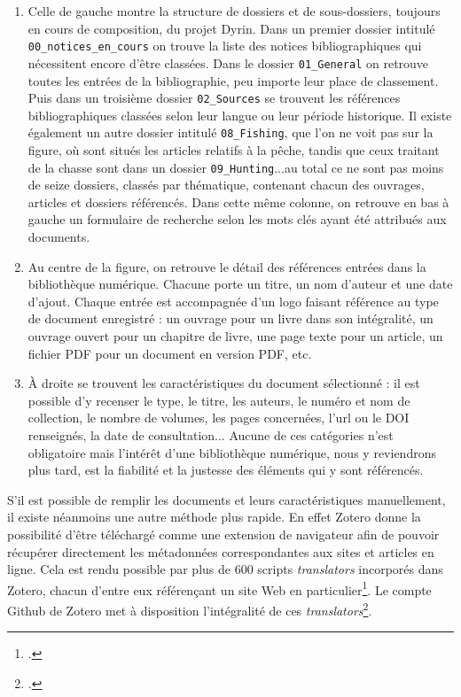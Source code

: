 \documentclass[a4paper,12pt,twoside]{book}
\begin{document}
\begin{enumerate}
    \item Celle de gauche montre la structure de dossiers et de sous-dossiers, toujours en cours de composition, du projet Dyrin. Dans un premier dossier intitulé \texttt{00\_notices\_en\_cours} on trouve la liste des notices bibliographiques qui nécessitent encore d'être classées. Dans le dossier \texttt{01\_General} on retrouve toutes les entrées de la bibliographie, peu importe leur place de classement. Puis dans un troisième dossier \texttt{02\_Sources} se trouvent les références bibliographiques classées selon leur langue ou leur période historique. Il existe également un autre dossier intitulé \texttt{08\_Fishing}, que l'on ne voit pas sur la figure, où sont situés les articles relatifs à la pêche, tandis que ceux traitant de la chasse sont dans un dossier \texttt{09\_Hunting}...au total ce ne sont pas moins de seize dossiers, classés par thématique, contenant chacun des ouvrages, articles et dossiers référencés. Dans cette même colonne, on retrouve en bas à gauche un formulaire de recherche selon les mots clés ayant été attribués aux documents.
    \item Au centre de la figure, on retrouve le détail des références entrées dans la bibliothèque numérique. Chacune porte un titre, un nom d'auteur et une date d'ajout. Chaque entrée est accompagnée d'un logo faisant référence au type de document enregistré : un ouvrage pour un livre dans son intégralité, un ouvrage ouvert pour un chapitre de livre, une page texte pour un article, un fichier PDF pour un document en version PDF, etc.
    \item À droite se trouvent les caractéristiques du document sélectionné : il est possible d'y recenser le type, le titre, les auteurs, le numéro et nom de collection, le nombre de volumes, les pages concernées, l'url ou le DOI renseignés, la date de consultation... Aucune de ces catégories n'est obligatoire mais l'intérêt d'une bibliothèque numérique, nous y reviendrons plus tard, est la fiabilité et la justesse des éléments qui y sont référencés. 
\end{enumerate}

S'il est possible de remplir les documents et leurs caractéristiques manuellement, il existe néanmoins une autre méthode plus \og rapide\fg. En effet Zotero donne la possibilité d'être téléchargé comme une extension de navigateur afin de pouvoir récupérer directement les métadonnées correspondantes aux sites et articles en ligne. Cela est rendu possible par plus de 600 scripts \textit{translators} incorporés dans Zotero, chacun d'entre eux référençant un site Web en particulier\footcite{translators}. Le compte Github de Zotero met à disposition l'intégralité de ces \textit{translators}\footcite{githubzotero}.
\end{document}
